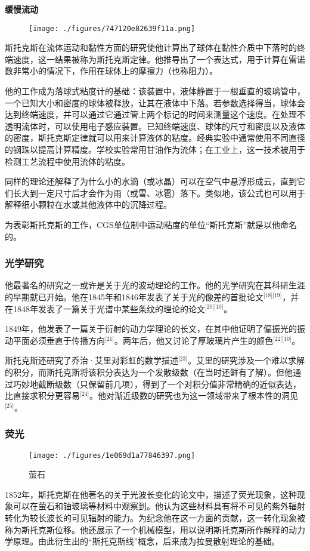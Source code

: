 \textbf{缓慢流动}
\begin{figure}[ht]
\centering
\texttt{[image: ./figures/747120e82639f11a.png]}
\caption{} \label{fig_QZstks_1}
\end{figure}
斯托克斯在流体运动和黏性方面的研究使他计算出了球体在黏性介质中下落时的终端速度，这一结果被称为斯托克斯定律。他推导出了一个表达式，用于计算在雷诺数非常小的情况下，作用在球体上的摩擦力（也称阻力）。

他的工作成为落球式粘度计的基础：该装置中，液体静置于一根垂直的玻璃管中，一个已知大小和密度的球体被释放，让其在液体中下落。若参数选择得当，球体会达到终端速度，并可以通过它通过管上两个标记的时间来测量这个速度。在处理不透明流体时，可以使用电子感应装置。已知终端速度、球体的尺寸和密度以及液体的密度，斯托克斯定律就可以用来计算液体的粘度。经典实验中通常使用不同直径的钢珠以提高计算精度。学校实验常用甘油作为流体；在工业上，这一技术被用于检测工艺流程中使用流体的粘度。

同样的理论还解释了为什么小的水滴（或冰晶）可以在空气中悬浮形成云，直到它们长大到一定尺寸后才会作为雨（或雪、冰雹）落下。类似地，该公式也可以用于解释细小颗粒在水或其他液体中的沉降过程。

为表彰斯托克斯的工作，CGS单位制中运动粘度的单位“斯托克斯”就是以他命名的。
\subsubsection{光学研究}
他最著名的研究之一或许是关于光的波动理论的工作。他的光学研究在其科研生涯的早期就已开始。他在1845年和1846年发表了关于光的像差的首批论文\(^\text{[18][19]}\)，并在1848年发表了一篇关于光谱中某些条纹的理论的论文\(^\text{[20][10]}\)。

1849年，他发表了一篇关于衍射的动力学理论的长文，在其中他证明了偏振光的振动平面必须垂直于传播方向\(^\text{[21]}\)。两年后，他又讨论了厚玻璃片产生的颜色\(^\text{[22][10]}\)。

斯托克斯还研究了乔治·艾里对彩虹的数学描述\(^\text{[23]}\)。艾里的研究涉及一个难以求解的积分，而斯托克斯将该积分表达为一个发散级数（在当时还鲜有了解）。但他通过巧妙地截断级数（只保留前几项），得到了一个对积分值非常精确的近似表达，比直接求积分更容易\(^\text{[24]}\)。他对渐近级数的研究也为这一领域带来了根本性的洞见\(^\text{[25]}\)。
\subsubsection{荧光}
\begin{figure}[ht]
\centering
\texttt{[image: ./figures/1e069d1a77846397.png]}
\caption{萤石} \label{fig_QZstks_3}
\end{figure}
1852年，斯托克斯在他著名的关于光波长变化的论文中，描述了荧光现象，这种现象可以在萤石和铀玻璃等材料中观察到。他认为这些材料具有将不可见的紫外辐射转化为较长波长的可见辐射的能力。为纪念他在这一方面的贡献，这一转化现象被称为斯托克斯位移。他还展示了一个机械模型，用以说明斯托克斯所作解释的动力学原理。由此衍生出的“斯托克斯线”概念，后来成为拉曼散射理论的基础。

